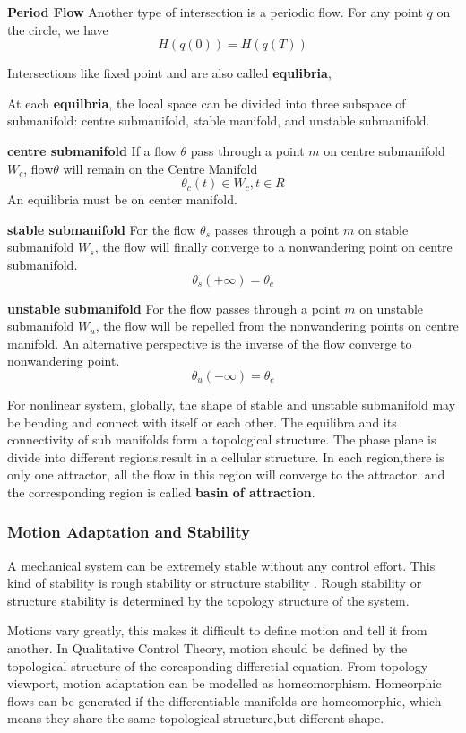 \textbf {Period Flow} Another type of intersection is a periodic flow. For any point $q$ on the circle, we have
\[
	H(q(0))=H(q(T))
\]


Intersections like fixed point and are also called \textbf{equlibria}, 

At each \textbf{equilbria}, 
the local space can be divided into three subspace of submanifold: centre submanifold, stable manifold, and unstable submanifold.

\textbf{centre submanifold}
If a flow $\theta$ pass through a point $m$ on centre submanifold $W_{c}$,
flow$\theta$ will remain on the Centre Manifold 
\[
\theta_{c}(t) \in W_{c}, t \in R
\]
 An equilibria must be on center manifold.

 
\textbf{stable submanifold}
For the flow $\theta_{s}$ passes through a point $m$ on stable submanifold $W_{s}$, the flow will finally converge to a nonwandering point on centre submanifold.
\[
\theta_{s}(+\infty)=\theta_{c}
\]

\textbf{unstable submanifold}
For the flow passes through a point $m$ on unstable submanifold $W_{u}$, the flow will be repelled from the nonwandering points on centre manifold.
An alternative perspective is the inverse of the flow converge to nonwandering point. 
\[
\theta_{u}(-\infty)=\theta_{c}
\] 



For nonlinear system, globally, the shape of stable and unstable submanifold may be bending and connect with itself or each other.
The equilibra and its connectivity of sub manifolds form a topological structure.
The phase plane is divide into different regions,result in a cellular structure.
In each region,there is only one attractor, all the flow in this region will converge to the attractor.
and the corresponding region is called \textbf{basin of attraction}.
\subsubsection{Motion Adaptation and Stability}
A mechanical system can be extremely stable without any control effort. 
This kind of stability is rough stability or structure stability \citep{Andronov1937}.
Rough stability or structure stability is determined by the topology structure of the system\citep{Jonckheere1997}.

Motions vary greatly, this makes it difficult to define motion and tell it from another.
In Qualitative Control Theory, motion should be defined by the topological structure of the coresponding differetial equation.
From topology viewport, motion adaptation can be modelled as homeomorphism.
Homeorphic flows can be generated if the differentiable manifolds are homeomorphic, which means they share the same topological structure,but different shape.

